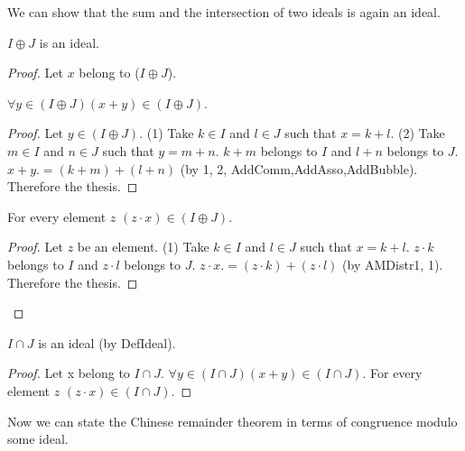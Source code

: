\documentclass[english]{article}
\begin{document}
  We can show that the sum and the intersection of two ideals is again an ideal.

  \begin{forthel}
    \begin{lemma}\label{IdeSum}
      $I \oplus J$ is an ideal.
    \end{lemma}
    \begin{proof}
      Let $x$ belong to ($I \oplus J$).

      $\forall y \in (I \oplus J) (x + y) \in (I \oplus J)$.
      \begin{proof}
        Let $y \in (I \oplus J)$.
        (1) Take $k \in I$ and $l \in J$ such that $x = k + l$.
        (2) Take $m \in I$ and $n \in J$ such that $y = m + n$.
        $k + m$ belongs to $I$ and $l + n$ belongs to $J$.
        $x + y .= (k + m) + (l + n)$ (by 1, 2, AddComm,AddAsso,AddBubble).
        Therefore the thesis.
      \end{proof}

      For every element $z$ $(z \cdot x) \in (I \oplus J)$.
      \begin{proof}
        Let $z$ be an element.
        (1) Take $k \in I$ and $l \in J$ such that $x = k + l$.
        $z \cdot k$ belongs to $I$ and $z \cdot l$ belongs to $J$.
        $z \cdot x .= (z \cdot k) + (z \cdot l)$ (by AMDistr1, 1).
        Therefore the thesis.
      \end{proof}
    \end{proof}


    \begin{lemma}\label{IdeInt}
      $I \cap J$ is an ideal (by DefIdeal).
    \end{lemma}
    \begin{proof}
      Let x belong to $I \cap J$.
      $\forall y \in (I \cap J) (x + y) \in (I \cap J)$.
      For every element $z$ $(z \cdot x) \in (I \cap J)$.
    \end{proof}
  \end{forthel}

  Now we can state the Chinese remainder theorem in terms of congruence modulo
  some ideal.
\end{document}
